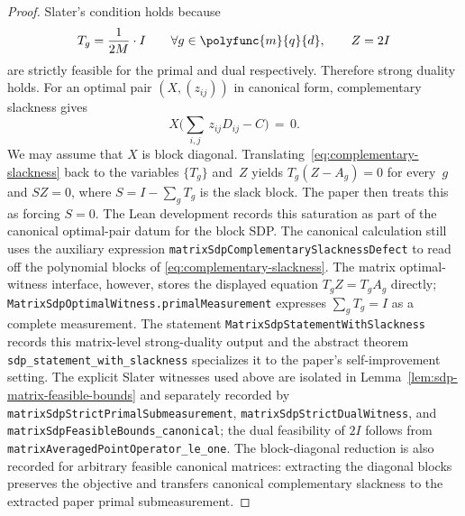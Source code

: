 \begin{proof}
  Slater's condition holds because
  \[
    T_g = \frac{1}{2M}\cdot I \qquad\forall g\in\polyfunc{m}{q}{d},
    \qquad
    Z = 2I
  \]
  are strictly feasible for the primal and dual respectively. Therefore strong duality holds. For an optimal pair $(X,(z_{ij}))$ in canonical form, complementary slackness gives
  \begin{equation}\label{eq:complementary-slackness}
    X\Big( \sum_{i,j} \,z_{ij} D_{ij} - C \Big) \,=\, 0.
  \end{equation}
  We may assume that $X$ is block diagonal.
  Translating~\eqref{eq:complementary-slackness} back to the variables
  $\{T_g\}$ and~$Z$ yields $T_g(Z-A_g)=0$ for every~$g$ and \(S Z=0\), where
  \(S=I-\sum_gT_g\) is the slack block.
  The paper then treats this as forcing \(S=0\).  The Lean development records
  this saturation as part of the canonical optimal-pair datum for the block
  SDP.  The canonical calculation still uses the auxiliary expression
  \texttt{matrixSdpComplementarySlacknessDefect} to read off the polynomial
  blocks of \eqref{eq:complementary-slackness}.  The matrix optimal-witness
  interface, however, stores the displayed equation \(T_gZ=T_gA_g\) directly;
  \texttt{MatrixSdpOptimalWitness.primalMeasurement} expresses
  \(\sum_g T_g=I\) as a complete measurement.  The statement
  \texttt{MatrixSdpStatementWithSlackness} records this matrix-level
  strong-duality output and the abstract theorem
  \texttt{sdp\_statement\_with\_slackness} specializes it to the paper's
  self-improvement setting.  The explicit Slater witnesses used above are
  isolated in Lemma~\ref{lem:sdp-matrix-feasible-bounds} and separately recorded
  by \texttt{matrixSdpStrictPrimalSubmeasurement},
  \texttt{matrixSdpStrictDualWitness}, and
  \texttt{matrixSdpFeasibleBounds\_canonical}; the dual feasibility of \(2I\)
  follows from \texttt{matrixAveragedPointOperator\_le\_one}.
  The block-diagonal reduction is also recorded for arbitrary feasible
  canonical matrices: extracting the diagonal blocks preserves the objective
  and transfers canonical complementary slackness to the extracted paper primal
  submeasurement.
\end{proof}


